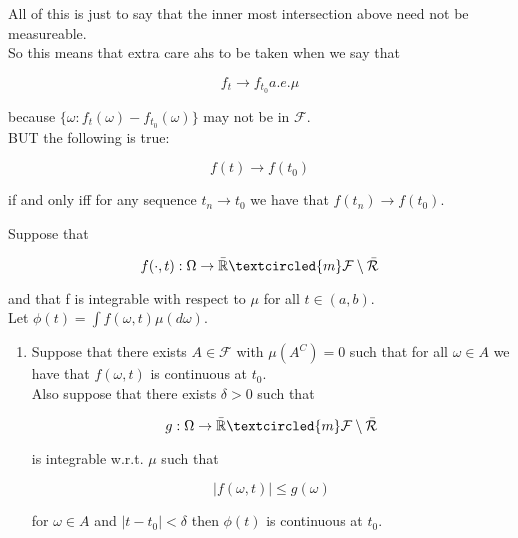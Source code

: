 \documentclass[11pt,fleqn]{book} %
\begin{document}
All of this is just to say that the inner most intersection above need not be measureable. \\

So this means that extra care ahs to be taken when we say that 

		$$ f_t \rightarrow f_{t_0} a.e. \mu$$

because $\{\omega: f_t(\omega) - f_{t_0} (\omega) \}$ may not be in $\mathcal{F}$. \\

BUT the following is true: 
		
		$$ f(t) \rightarrow f (t_0)$$

if and only iff for any sequence $t_n \rightarrow t_0$ we have that $f(t_n) \rightarrow f(t_0)$.


\begin{theorem}[16.8]
	Suppose that 

			$$f(\cdot, t): \Omega \rightarrow \bar{\mathbb{R}} \textcircled{m} \mathcal{F} \setminus \mathcal{\bar{R}} $$

	and that f is integrable with respect to $\mu$ for all $t \in (a, b)$. \\

	Let $\phi(t) = \int f(\omega, t) \mu(d\omega)$. 

			\begin{enumerate}
				\item Suppose that there exists $A \in \mathcal{F}$ with $\mu(A^C) = 0$ such that for all $\omega \in A$ we have  that $f(\omega, t) $ is continuous at $t_0$. \\

				Also suppose that there exists $\delta > 0$ such that

						$$g: \Omega\rightarrow \bar{\mathbb{R}} \textcircled{m} \mathcal{F} \setminus \mathcal{\bar{R}} $$

				is integrable w.r.t. $\mu$ such that 

						$$|f(\omega, t) | \leq g(\omega) $$

				for $\omega \in A$ and $|t- t_0| < \delta$ then $\phi(t)$ is continuous at $t_0$. 
			\end{enumerate}
\end{theorem}
\end{document}
